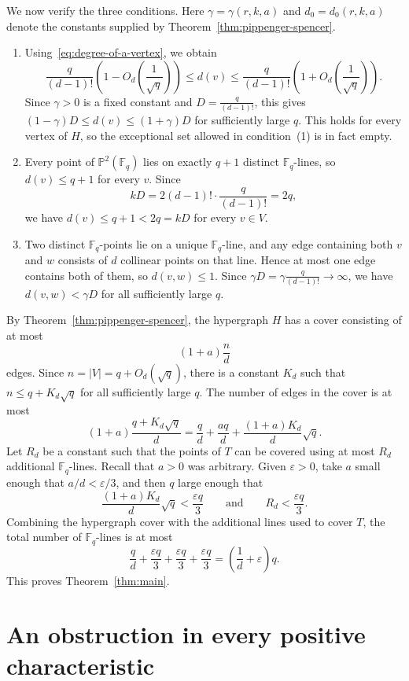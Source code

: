 \documentclass[10pt,a4paper]{amsart}
\theoremstyle{definition}
\theoremstyle{remark}
\newcommand{\Fq}{\mathbb{F}_q}
\newcommand{\bP}{\mathbb{P}}
\begin{document}
We now verify the three conditions. Here $\gamma=\gamma(r,k,a)$ and $d_0=d_0(r,k,a)$ denote the constants supplied by Theorem~\ref{thm:pippenger-spencer}.
\begin{enumerate}
    \item Using~\eqref{eq:degree-of-a-vertex}, we obtain
    \[
    \frac{q}{(d-1)!}\left(1-O_d\left(\frac{1}{\sqrt{q}}\right)\right)
    \leq d(v)\leq
    \frac{q}{(d-1)!}\left(1+O_d\left(\frac{1}{\sqrt{q}}\right)\right).
    \]
    Since $\gamma>0$ is a fixed constant and $D=\frac{q}{(d-1)!}$, this gives $(1-\gamma)D\leq d(v)\leq(1+\gamma)D$ for sufficiently large $q$. This holds for every vertex of $H$, so the exceptional set allowed in condition~(1) is in fact empty.
    \item Every point of $\bP^2(\Fq)$ lies on exactly $q+1$ distinct $\Fq$-lines, so $d(v)\leq q+1$ for every $v$. Since
    \[
    kD=2(d-1)!\cdot\frac{q}{(d-1)!}=2q,
    \]
    we have $d(v)\leq q+1<2q=kD$ for every $v\in V$.
    \item Two distinct $\Fq$-points lie on a unique $\Fq$-line, and any edge containing both $v$ and $w$ consists of $d$ collinear points on that line. Hence at most one edge contains both of them, so $d(v,w)\leq 1$. Since $\gamma D=\gamma\frac{q}{(d-1)!}\to\infty$, we have $d(v,w)<\gamma D$ for all sufficiently large $q$.
\end{enumerate}
By Theorem~\ref{thm:pippenger-spencer}, the hypergraph $H$ has a cover
consisting of at most
\[
(1+a)\frac{n}{d}
\]
edges. Since $n=|V|=q+O_d(\sqrt q)$, there is a constant $K_d$ such that $n\leq q+K_d\sqrt q$ for all sufficiently large $q$. The number of edges in the cover is at most
\[
(1+a)\frac{q+K_d\sqrt q}{d}
=
\frac{q}{d}+\frac{aq}{d}+\frac{(1+a)K_d}{d}\sqrt q.
\]
Let $R_d$ be a constant such that the points of $T$ can be covered using at most $R_d$ additional $\Fq$-lines. Recall that $a>0$ was arbitrary. Given $\varepsilon>0$, take $a$ small enough that $a/d<\varepsilon/3$, and then $q$ large enough that
\[
\frac{(1+a)K_d}{d}\sqrt q<\frac{\varepsilon q}{3}
\qquad\text{and}\qquad
R_d<\frac{\varepsilon q}{3}.
\]
Combining the hypergraph cover with the additional lines used to cover $T$, the total number of $\Fq$-lines is at most
\[
\frac{q}{d}+\frac{\varepsilon q}{3}+\frac{\varepsilon q}{3}+\frac{\varepsilon q}{3}
=
\left(\frac{1}{d}+\varepsilon\right)q.
\]
This proves Theorem~\ref{thm:main}.


\section{An obstruction in every positive characteristic}\label{sec:obstruction}
\end{document}
